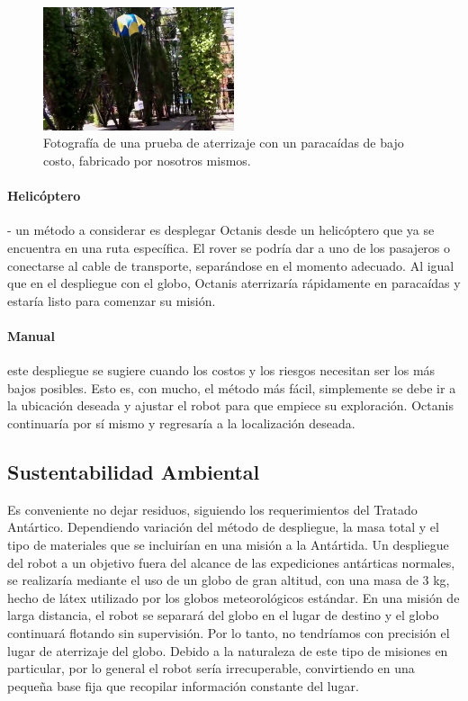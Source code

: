 \documentclass[a4paper,12pt]{article}
\begin{document}
\begin{figure}[h!]
	\centering
    \includegraphics[width=0.5\textwidth]{lowcostchute}
    \caption{Fotografía de una prueba de aterrizaje con un paracaídas de bajo costo, fabricado por nosotros mismos.}
\end{figure}


\paragraph{Helicóptero} - un método a considerar es desplegar Octanis desde un helicóptero que ya se encuentra en una ruta específica. El rover se podría dar a uno de los pasajeros o conectarse al cable de transporte, separándose en el momento adecuado. Al igual que en el despliegue con el globo, Octanis aterrizaría rápidamente en paracaídas y estaría listo para comenzar su misión.


\paragraph{Manual} este despliegue se sugiere cuando los costos y los riesgos necesitan ser los más bajos posibles. Esto es, con mucho, el método más fácil, simplemente se debe ir a la ubicación deseada y ajustar el robot para que empiece su exploración. Octanis continuaría por sí mismo y regresaría a la localización deseada.



\subsection{Sustentabilidad Ambiental}
Es conveniente no dejar residuos, siguiendo los requerimientos del Tratado Antártico. Dependiendo variación del método de despliegue, la masa total y el tipo de materiales que se incluirían en una misión a la Antártida. Un despliegue del robot a un objetivo fuera del alcance de las expediciones antárticas normales, se realizaría mediante el uso de un globo de gran altitud, con una masa de 3 kg, hecho de látex utilizado por los globos meteorológicos estándar. En una misión de larga distancia, el robot se separará del globo en el lugar de destino y el globo continuará flotando sin supervisión. Por lo tanto, no tendríamos con precisión el lugar de aterrizaje del globo. Debido a la naturaleza de este tipo de misiones en particular, por lo general el robot sería irrecuperable, convirtiendo en una pequeña base fija que recopilar información constante del lugar.
\end{document}

